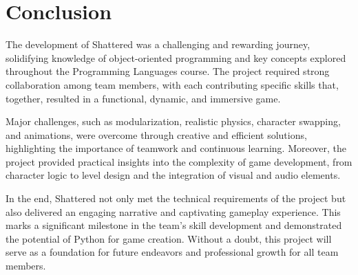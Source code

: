 \section{Conclusion}
The development of Shattered was a challenging and rewarding journey, solidifying knowledge of object-oriented programming and key concepts explored throughout the Programming Languages course. The project required strong collaboration among team members, with each contributing specific skills that, together, resulted in a functional, dynamic, and immersive game.

Major challenges, such as modularization, realistic physics, character swapping, and animations, were overcome through creative and efficient solutions, highlighting the importance of teamwork and continuous learning. Moreover, the project provided practical insights into the complexity of game development, from character logic to level design and the integration of visual and audio elements.

In the end, Shattered not only met the technical requirements of the project but also delivered an engaging narrative and captivating gameplay experience. This marks a significant milestone in the team’s skill development and demonstrated the potential of Python for game creation. Without a doubt, this project will serve as a foundation for future endeavors and professional growth for all team members.